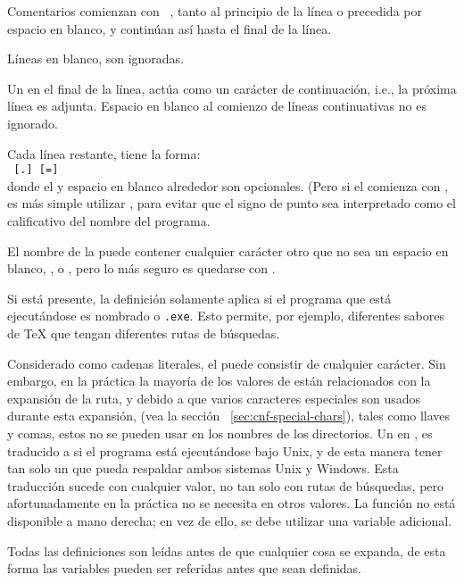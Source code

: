 \documentclass{article}
\begin{document}
\begin{itemize*}
	\item 
		Comentarios comienzan con ~\code{\%}, tanto al principio de la línea o precedida por espacio en blanco, y continúan así hasta el final de la línea.
		 
		\item
			Líneas en blanco, son ignoradas.
		\item
			Un \bs{} en el final de la línea,
			actúa como un carácter de
			continuación, i.e., la próxima línea
			es adjunta. Espacio en blanco al
			comienzo de líneas continuativas no es
			ignorado. 
		\item
			Cada línea restante, tiene la forma:\\
\hspace*{2em}\texttt{ \textrm{[}.\textrm{]}
  \textrm{[}=\textrm{]} }\\[1pt]
			donde el \samp{=} y espacio en blanco
			alrededor son opcionales. 
			(Pero si el  comienza con , es más simple utilizar \samp{=}, para evitar que el signo de punto sea interpretado como el calificativo del nombre del programa.
		\item
			El nombre de la  puede
			contener cualquier carácter otro que
			no sea un espacio en blanco, \samp{=},
			o , pero lo más seguro es
			quedarse con .
		\item
			Si  está
			presente, la definición solamente
			aplica si el programa que está
			ejecutándose es nombrado
			\texttt{} o
			\texttt{.exe}. Esto 
			permite, por ejemplo, diferentes
			sabores de \TeX{} que tengan
			diferentes rutas de búsquedas.  
		\item  Considerado como cadenas literales, el
			 puede consistir de cualquier
			carácter. Sin embargo, en la práctica la mayoría
			de los valores de  están
			relacionados con la expansión de la ruta, y
			debido a que varios caracteres especiales son
			usados durante esta expansión, (vea la sección
			~\ref{sec:cnf-special-chars}), tales como llaves
			y comas, estos no se pueden usar en los nombres
			de los directorios.  Un \samp{;} en \var{:}, es
			traducido a \samp{:} si el programa está
			ejecutándose bajo Unix, y de esta manera tener
			tan solo un  que pueda respaldar
			ambos sistemas Unix y Windows. Esta traducción
			sucede con cualquier valor, no tan solo con
			rutas de búsquedas, pero afortunadamente en la
			práctica \samp{;} no se necesita en otros
			valores.  La función  no está disponible  a mano derecha;
			en vez de ello, se debe utilizar una variable
			adicional.  
		\item
			Todas las definiciones son leídas
			antes de que cualquier cosa se
			expanda, de esta forma las variables
			pueden ser referidas antes que sean
			definidas. 
	\end{itemize*}
\end{document}
